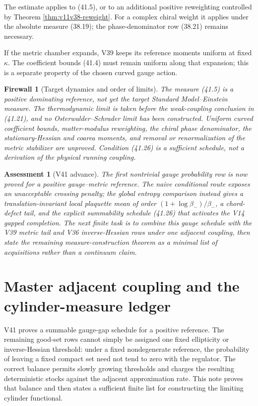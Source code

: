 \documentclass[11pt]{article}
\newtheorem{assessment}[theorem]{Assessment}
\newtheorem{firewall}[theorem]{Firewall}
\begin{document}
The estimate applies to (41.5), or to an additional positive
reweighting controlled by Theorem \ref{thm:v11v38-reweight}.  For a
complex chiral weight it applies under the absolute measure (38.19);
the phase-denominator row (38.21) remains necessary.

If the metric chamber expands, V39 keeps its reference moments uniform
at fixed \(\kappa\).  The coefficient bounds (41.4) must remain uniform
along that expansion; this is a separate property of the chosen curved
gauge action.

\begin{firewall}[Target dynamics and order of limits]
\label{fw:v11v41-target}
The measure (41.5) is a positive dominating reference, not yet the
target Standard Model--Einstein measure.  The thermodynamic limit is
taken before the weak-coupling conclusion in (41.21), and no
Osterwalder--Schrader limit has been constructed.  Uniform curved
coefficient bounds, matter-modulus reweighting, the chiral phase
denominator, the stationary-Hessian and coarea moments, and removal or
renormalization of the metric stabilizer are unproved.  Condition
(41.26) is a sufficient schedule, not a derivation of the physical
running coupling.
\end{firewall}

\begin{assessment}[V41 advance]
\label{ass:v11v41}
The first nontrivial gauge probability row is now proved for a positive
gauge--metric reference.  The naive conditional route exposes an
unacceptable crossing penalty; the global entropy comparison instead
gives a translation-invariant local plaquette mean of order
\((1+\log\beta_-)/\beta_-\), a chord-defect tail, and the explicit
summability schedule (41.26) that activates the V14 gapped completion.
The next finite task is to combine this gauge schedule with the V39
metric tail and V36 inverse-Hessian rows under one adjacent coupling,
then state the remaining measure-construction theorem as a minimal list
of acquisitions rather than a continuum claim.
\end{assessment}
\section{Master adjacent coupling and the cylinder-measure ledger}
\label{sec:v11v42}

V41 proves a summable gauge-gap schedule for a positive reference.
The remaining good-set rows cannot simply be assigned one fixed
ellipticity or inverse-Hessian threshold: under a fixed nondegenerate
reference, the probability of leaving a fixed compact set need not tend
to zero with the regulator.  The correct balance permits slowly growing
thresholds and charges the resulting deterministic stocks against the
adjacent approximation rate.  This note proves that balance and then
states a sufficient finite list for constructing the limiting cylinder
functional.
\end{document}
